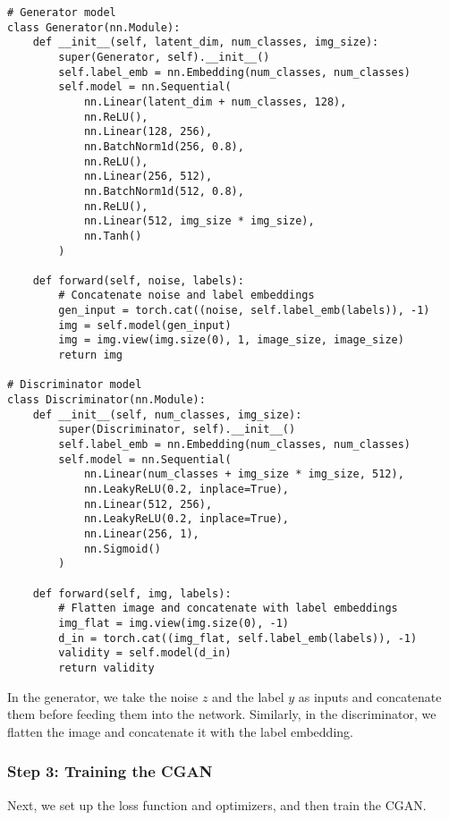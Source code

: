 \begin{lstlisting}[style=python]
# Generator model
class Generator(nn.Module):
    def __init__(self, latent_dim, num_classes, img_size):
        super(Generator, self).__init__()
        self.label_emb = nn.Embedding(num_classes, num_classes)
        self.model = nn.Sequential(
            nn.Linear(latent_dim + num_classes, 128),
            nn.ReLU(),
            nn.Linear(128, 256),
            nn.BatchNorm1d(256, 0.8),
            nn.ReLU(),
            nn.Linear(256, 512),
            nn.BatchNorm1d(512, 0.8),
            nn.ReLU(),
            nn.Linear(512, img_size * img_size),
            nn.Tanh()
        )
    
    def forward(self, noise, labels):
        # Concatenate noise and label embeddings
        gen_input = torch.cat((noise, self.label_emb(labels)), -1)
        img = self.model(gen_input)
        img = img.view(img.size(0), 1, image_size, image_size)
        return img

# Discriminator model
class Discriminator(nn.Module):
    def __init__(self, num_classes, img_size):
        super(Discriminator, self).__init__()
        self.label_emb = nn.Embedding(num_classes, num_classes)
        self.model = nn.Sequential(
            nn.Linear(num_classes + img_size * img_size, 512),
            nn.LeakyReLU(0.2, inplace=True),
            nn.Linear(512, 256),
            nn.LeakyReLU(0.2, inplace=True),
            nn.Linear(256, 1),
            nn.Sigmoid()
        )

    def forward(self, img, labels):
        # Flatten image and concatenate with label embeddings
        img_flat = img.view(img.size(0), -1)
        d_in = torch.cat((img_flat, self.label_emb(labels)), -1)
        validity = self.model(d_in)
        return validity
\end{lstlisting}

In the generator, we take the noise \( z \) and the label \( y \) as inputs and concatenate them before feeding them into the network. Similarly, in the discriminator, we flatten the image and concatenate it with the label embedding.

\subsubsection{Step 3: Training the CGAN}
Next, we set up the loss function and optimizers, and then train the CGAN.

